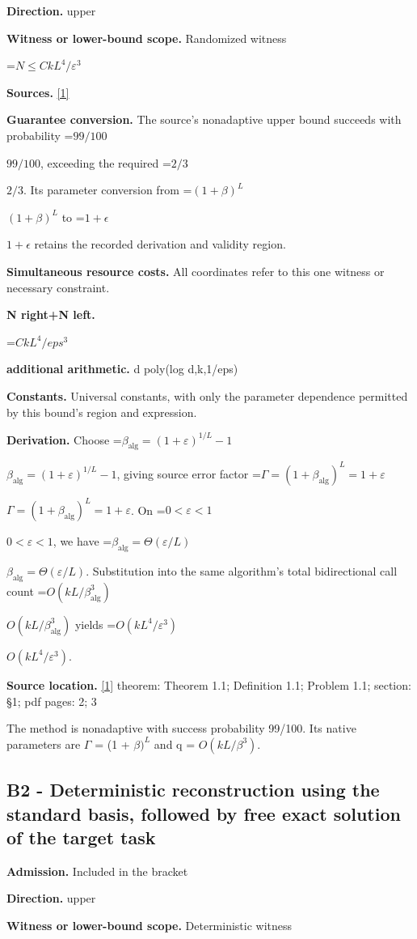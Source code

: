 \documentclass[10pt,a4paper]{article}
\newcommand{\AtlasMath}[1]{\par\begingroup\centering\setbox0=\hbox{$\displaystyle #1$}\ifdim\wd0>1.4\linewidth\typeout{ATLAS WIDE FORMULA: \the\wd0}\fi\ifdim\wd0>\linewidth\resizebox{\linewidth}{!}{\box0}\else\box0\fi\par\endgroup}
\newcommand{\AtlasInlineMath}[1]{\begingroup\setbox0=\hbox{$#1$}\ifdim\wd0>.4\linewidth\endgroup\AtlasMath{#1}\else\endgroup$#1$\fi}
\begin{document}
\textbf{Direction.} upper

\textbf{Witness or lower-bound scope.} Randomized witness

\AtlasMath{N\le C kL^4/\varepsilon^3}
\textbf{Sources.} \href{https://arxiv.org/pdf/2407.04686v2}{[1]}

\textbf{Guarantee conversion.} The source's nonadaptive upper bound succeeds with probability \AtlasInlineMath{99/100}, exceeding the required \AtlasInlineMath{2/3}. Its parameter conversion from \AtlasInlineMath{(1+\beta)^L} to \AtlasInlineMath{1+\epsilon} retains the recorded derivation and validity region.

\textbf{Simultaneous resource costs.} All coordinates refer to this one witness or necessary constraint.

\textbf{N right+N left.}

\AtlasMath{C k L^4 / eps^3}
\textbf{additional arithmetic.} d poly(log d,k,1/eps)

\textbf{Constants.} Universal constants, with only the parameter dependence permitted by this bound’s region and expression.

\textbf{Derivation.} Choose \AtlasInlineMath{\beta_{\mathrm{alg}}=(1+\varepsilon)^{1/L}-1}, giving source error factor \AtlasInlineMath{\Gamma=(1+\beta_{\mathrm{alg}})^L=1+\varepsilon}. On \AtlasInlineMath{0<\varepsilon<1}, we have \AtlasInlineMath{\beta_{\mathrm{alg}}=\Theta(\varepsilon/L)}. Substitution into the same algorithm's total bidirectional call count \AtlasInlineMath{O(kL/\beta_{\mathrm{alg}}^3)} yields \AtlasInlineMath{O(kL^4/\varepsilon^3)}.

\textbf{Source location.} \href{https://arxiv.org/pdf/2407.04686v2}{[1]} theorem: Theorem 1.1; Definition 1.1; Problem 1.1; section: §1; pdf pages: 2; 3

The method is nonadaptive with success probability 99/100. Its native parameters are $\Gamma$ = (1 + $\beta )^L$ and q = $O(kL/\beta ^3)$.

\subsection{B2 - Deterministic reconstruction using the standard basis, followed by free exact solution of the target task}
\textbf{Admission.} Included in the bracket

\textbf{Direction.} upper

\textbf{Witness or lower-bound scope.} Deterministic witness
\end{document}
